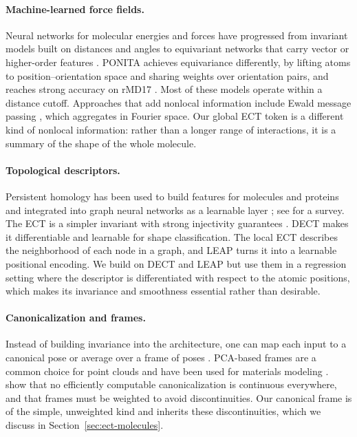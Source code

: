 \documentclass{article}
\begin{document}
\paragraph{Machine-learned force fields.}
Neural networks for molecular energies and forces have progressed from invariant models built on distances and angles \citep{schutt2017schnet,gasteiger2020dimenet,liu2022spherenet} to equivariant networks that carry vector or higher-order features \citep{satorras2021egnn,schutt2021painn,tholke2022torchmdnet,batzner2022nequip,batatia2022mace,musaelian2023allegro,liao2024equiformerv2}. PONITA \citep{bekkers2024ponita} achieves equivariance differently, by lifting atoms to position--orientation space and sharing weights over orientation pairs, and reaches strong accuracy on rMD17 \citep{chmiela2017md17,christensen2020rmd17}. Most of these models operate within a distance cutoff. Approaches that add nonlocal information include Ewald message passing \citep{kosmala2023ewald}, which aggregates in Fourier space. Our global ECT token is a different kind of nonlocal information: rather than a longer range of interactions, it is a summary of the shape of the whole molecule.

\paragraph{Topological descriptors.}
Persistent homology has been used to build features for molecules and proteins \citep{cang2017topologynet,townsend2020ph} and integrated into graph neural networks as a learnable layer \citep{horn2022togl}; see \citet{hensel2021survey} for a survey. The ECT \citep{turner2014pht} is a simpler invariant with strong injectivity guarantees \citep{ghrist2018euler,curry2022directions}. DECT \citep{roell2024dect} makes it differentiable and learnable for shape classification. The local ECT \citep{vonrohrscheidt2025disslect} describes the neighborhood of each node in a graph, and LEAP \citep{garciaamboage2026leap} turns it into a learnable positional encoding. We build on DECT and LEAP but use them in a regression setting where the descriptor is differentiated with respect to the atomic positions, which makes its invariance and smoothness essential rather than desirable.

\paragraph{Canonicalization and frames.}
Instead of building invariance into the architecture, one can map each input to a canonical pose \citep{kaba2023canonicalization} or average over a frame of poses \citep{puny2022frame}. PCA-based frames are a common choice for point clouds and have been used for materials modeling \citep{duval2023faenet}. \citet{dym2024frames} show that no efficiently computable canonicalization is continuous everywhere, and that frames must be weighted to avoid discontinuities. Our canonical frame is of the simple, unweighted kind and inherits these discontinuities, which we discuss in Section~\ref{sec:ect-molecules}.
\end{document}
